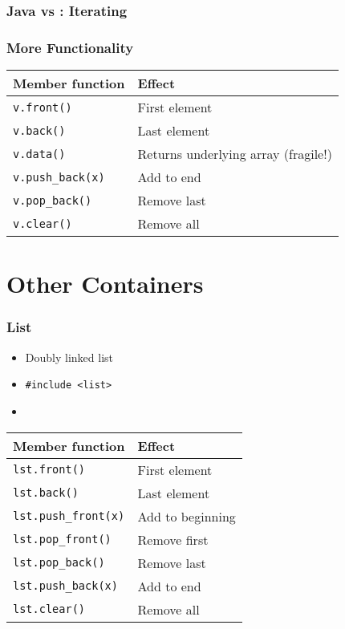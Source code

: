 \begin{frame}
  \frametitle{Java vs \cpp: Iterating}
  \vskip2mm
  \structure{\cpp}
\end{frame}

\begin{frame}
  \frametitle{More Functionality}
  \begin{center}
    \begin{tabular}{ll}
      \textbf{Member function} & \textbf{Effect} \\
      \toprule
      \texttt{v.front()}       & First element \\
      \texttt{v.back()}        & Last element \\
      \texttt{v.data()}        & Returns underlying array (fragile!) \\
      \texttt{v.push\_back(x)} & Add to end \\
      \texttt{v.pop\_back()}   & Remove last \\
      \texttt{v.clear()}       & Remove all \\
    \end{tabular}
  \end{center}
\end{frame}


\section{Other Containers}

\frame{\tableofcontents[currentsection]}

\begin{frame}
  \frametitle{List}
  \begin{itemize}
    \item Doubly linked list
    \item \texttt{\#include <list>}
    \item {}
  \end{itemize}
  \begin{center}
    \begin{tabular}{ll}
      \textbf{Member function} & \textbf{Effect} \\
      \toprule
      \texttt{lst.front()}        & First element \\
      \texttt{lst.back()}         & Last element \\
      \texttt{lst.push\_front(x)} & Add to beginning \\
      \texttt{lst.pop\_front()}   & Remove first \\
      \texttt{lst.pop\_back()}    & Remove last \\
      \texttt{lst.push\_back(x)}  & Add to end \\
      \texttt{lst.clear()}        & Remove all \\
    \end{tabular}
  \end{center}
\end{frame}

